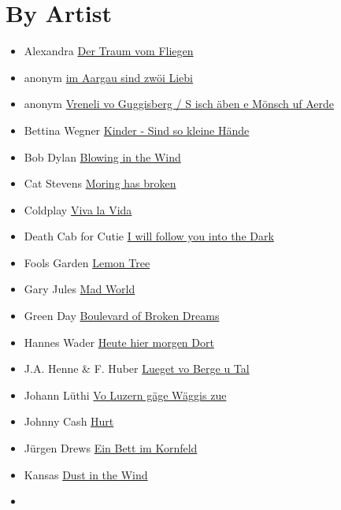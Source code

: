 \documentclass[
]{book}
\providecommand{\tightlist}{%
  \setlength{\itemsep}{0pt}\setlength{\parskip}{0pt}}
\let\stdsection\section
\renewcommand\section{\clearpage\stdsection}
\begin{document}
\hypertarget{by-artist}{%
\section{By Artist}\label{by-artist}}

\begin{itemize}
\tightlist
\item
  Alexandra \protect\hyperlink{mundart-und-deutsch-der-traum-vom-fliegen}{Der Traum vom Fliegen}
\item
  anonym \protect\hyperlink{volsklieder-im-aargau}{im Aargau sind zwöi Liebi}
\item
  anonym \protect\hyperlink{volsklieder-guggisberg}{Vreneli vo Guggisberg / S isch äben e Mönsch uf Aerde}
\item
  Bettina Wegner \protect\hyperlink{mundart-und-deutsch-so-kleine-haende}{Kinder - Sind so kleine Hände}
\item
  Bob Dylan \protect\hyperlink{classics-blowing-in-the-wind}{Blowing in the Wind}
\item
  Cat Stevens \protect\hyperlink{classics-morning-has-broken}{Moring has broken}
\item
  Coldplay \protect\hyperlink{selected-songs-viva-la-vida}{Viva la Vida}
\item
  Death Cab for Cutie \protect\hyperlink{selected-songs-i-will-follow-you-into-the-dark}{I will follow you into the Dark}
\item
  Fools Garden \protect\hyperlink{classics-lemon-tree}{Lemon Tree}
\item
  Gary Jules \protect\hyperlink{selected-songs-mad-world}{Mad World}
\item
  Green Day \protect\hyperlink{classics-boulevard-of-broken-dreams}{Boulevard of Broken Dreams}
\item
  Hannes Wader \protect\hyperlink{mundart-und-deutsch-heute-hier-morgen-dort}{Heute hier morgen Dort}
\item
  J.A. Henne \& F. Huber \protect\hyperlink{volsklieder-lueged-vo-berge-u-tal}{Lueget vo Berge u Tal}
\item
  Johann Lüthi \protect\hyperlink{volsklieder-vo-luzern}{Vo Luzern gäge Wäggis zue}
\item
  Johnny Cash \protect\hyperlink{classics-hurt}{Hurt}
\item
  Jürgen Drews \protect\hyperlink{classics-ein-bett-im-kornfeld}{Ein Bett im Kornfeld}
\item
  Kansas \protect\hyperlink{classics-dust-in-the-wind}{Dust in the Wind}
\item

\end{itemize}
\end{document}
